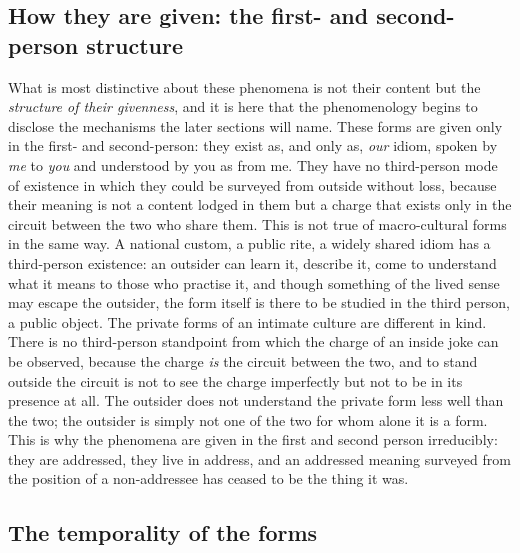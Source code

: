 \subsection*{How they are given: the first- and second-person structure}

What is most distinctive about these phenomena is not their content but the \emph{structure of their givenness}, and it is here that the phenomenology begins to disclose the mechanisms the later sections will name. These forms are given only in the first- and second-person: they exist as, and only as, \emph{our} idiom, spoken by \emph{me} to \emph{you} and understood by you as from me. They have no third-person mode of existence in which they could be surveyed from outside without loss, because their meaning is not a content lodged in them but a charge that exists only in the circuit between the two who share them. This is not true of macro-cultural forms in the same way. A national custom, a public rite, a widely shared idiom has a third-person existence: an outsider can learn it, describe it, come to understand what it means to those who practise it, and though something of the lived sense may escape the outsider, the form itself is there to be studied in the third person, a public object. The private forms of an intimate culture are different in kind. There is no third-person standpoint from which the charge of an inside joke can be observed, because the charge \emph{is} the circuit between the two, and to stand outside the circuit is not to see the charge imperfectly but not to be in its presence at all. The outsider does not understand the private form less well than the two; the outsider is simply not one of the two for whom alone it is a form. This is why the phenomena are given in the first and second person irreducibly: they are addressed, they live in address, and an addressed meaning surveyed from the position of a non-addressee has ceased to be the thing it was.

\subsection*{The temporality of the forms}

